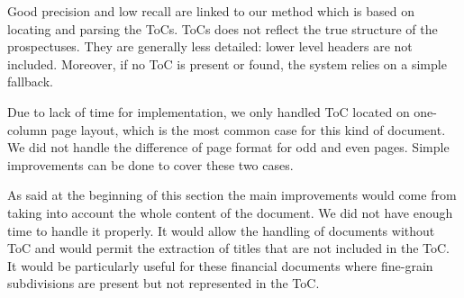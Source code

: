Good precision and low recall are linked to our method which is based on
locating and parsing the ToCs. ToCs does not reflect the true structure of the prospectuses. 
They are generally less detailed: lower level headers are not included. Moreover, 
if no ToC is present or found, the system relies on a simple fallback.

Due to lack of time for implementation, we only handled ToC located on one-column page layout, which is the most common case for this kind of document. We did not handle the difference of page format for odd and even pages. Simple improvements can be done to cover these two cases.

As said at the beginning of this section the main improvements would come from taking into account the whole content of the document. We did not have enough time to handle it properly. It would allow the handling of documents without ToC and would permit the extraction of titles that are not included in the ToC. It would be particularly useful for these financial documents where fine-grain subdivisions are present but not represented in the ToC.

